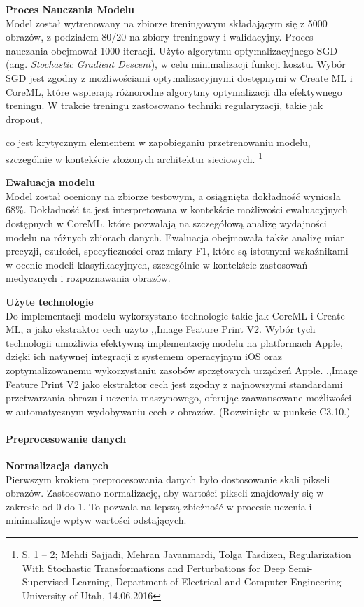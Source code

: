 \documentclass[12pt, a4paper, twoside, openany]{book}
\newcommand{\forceindent}{\leavevmode{\parindent=1.3em\indent}}
\begin{document}
\textbf{Proces Nauczania Modelu\\}
\forceindent Model został wytrenowany na zbiorze treningowym składającym się z 5000 obrazów, z podziałem 80/20 na zbiory treningowy i walidacyjny.
Proces nauczania obejmował 1000 iteracji.
Użyto algorytmu optymalizacyjnego SGD (ang. \textit{Stochastic Gradient Descent}), w celu minimalizacji funkcji kosztu.
Wybór SGD jest zgodny z możliwościami optymalizacyjnymi dostępnymi w Create ML i CoreML, które wspierają różnorodne algorytmy optymalizacji dla efektywnego treningu.
W trakcie treningu zastosowano techniki regularyzacji, takie jak dropout, {co jest krytycznym elementem w zapobieganiu przetrenowaniu modelu, szczególnie w kontekście złożonych architektur sieciowych. \footnote{
    S. 1 -- 2; Mehdi Sajjadi, Mehran Javanmardi, Tolga Tasdizen, Regularization With Stochastic Transformations and Perturbations for Deep Semi-Supervised Learning, Department of Electrical and Computer Engineering University of Utah, 14.06.2016
}

\textbf{Ewaluacja modelu\\}
\forceindent Model został oceniony na zbiorze testowym, a osiągnięta dokładność wyniosła 68\%.
Dokładność ta jest interpretowana w kontekście możliwości ewaluacyjnych dostępnych w CoreML, które pozwalają na szczegółową analizę wydajności modelu na różnych zbiorach danych.
Ewaluacja obejmowała także analizę miar precyzji, czułości, specyficzności oraz miary F1, które są istotnymi wskaźnikami w ocenie modeli klasyfikacyjnych, szczególnie w kontekście zastosowań medycznych i rozpoznawania obrazów.

\textbf{Użyte technologie\\}
\forceindent Do implementacji modelu wykorzystano technologie takie jak CoreML i Create ML, a jako ekstraktor cech użyto ,,Image Feature Print V2. Wybór tych technologii umożliwia efektywną implementację modelu na platformach Apple, dzięki ich natywnej integracji z systemem operacyjnym iOS oraz zoptymalizowanemu wykorzystaniu zasobów sprzętowych urządzeń Apple. ,,Image Feature Print V2 jako ekstraktor cech jest zgodny z najnowszymi standardami przetwarzania obrazu i uczenia maszynowego, oferując zaawansowane możliwości w automatycznym wydobywaniu cech z obrazów. (Rozwinięte w punkcie C3.10.)

\paragraph{Preprocesowanie danych\\}
\forceindent \textbf{ Normalizacja danych\\}
\indent Pierwszym krokiem preprocesowania danych było dostosowanie skali pikseli obrazów.
Zastosowano normalizację, aby wartości pikseli znajdowały się w zakresie od 0 do 1.
To pozwala na lepszą zbieżność w procesie uczenia i minimalizuje wpływ wartości odstających.

}
\end{document}
